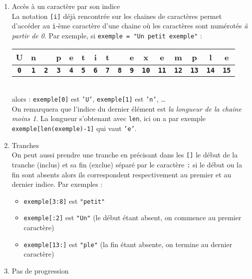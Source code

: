 \documentclass[11pt,a4paper]{article}
\begin{document}
\begin{tcolorbox}[left=0cm,title=\bf{\faPython \; Tranches},colbacktitle=cfond]
	\begin{enumerate}
	 \item[\ding{182}] Accès à un caractère par son indice \\
	 La notation {\tt [i]} déjà rencontrée sur les chaines de caractères permet d'accéder au {\tt i}-ème caractère d'une chaine où les caractères sont numérotés \textit{à partir de 0}. Par exemple,
	 si \texttt{exemple = "Un petit exemple"} : \\
	 \newcommand{\ind}[1]{\multicolumn{1}{c}{\textbf{\tt \footnotesize #1}}}
	 \begin{tabular}{|c|c|c|c|c|c|c|c|c|c|c|c|c|c|c|c|}
		\hline
		U & n & & p & e & t & i & t&  & e & x & e & m & p & l & e \\
		\hline
		\ind{0} & \ind{1}& \ind{2}& \ind{3}& \ind{4}& \ind{5}& \ind{6}& \ind{7}& \ind{8}& \ind{9}& \ind{10}& \ind{11}& \ind{12}& \ind{13}& \ind{14} & \ind{15}
	 \end{tabular}\\
	 alors : \texttt{exemple[0]} est {\tt 'U'}, \texttt{exemple[1]} est {\tt 'n'}, \dots \\
	 {\small \important} \; On remarquera que l'indice du dernier élément est  \textit{la longueur de la chaine moins 1}. La longueur s'obtenant avec {\tt len}, ici on a par exemple \texttt{exemple[len(exemple)-1]} qui vaut {\tt 'e'}.
	 \item[\ding{183}] Tranches \\
	 On peut aussi prendre une tranche en précisant dans les {\tt []} le début de la tranche (inclus) et sa fin (exclue) séparé par le caractère {\tt :} si le début ou la fin sont absents alors ils correspondent respectivement au premier et au dernier indice. Par exemples :
	 \begin{itemize}
	  \item[\textbullet] \texttt{exemple[3:8]} est {\tt "petit"}
	  \item[\textbullet] \texttt{exemple[:2]} est {\tt "Un"} (le début étant absent, on commence au premier caractère)
	  \item[\textbullet] \texttt{exemple[13:]} est {\tt "ple"} (la fin étant absente, on termine au dernier caractère)
	 \end{itemize}	
	\item[\ding{184}] Pas de progression \\

\end{enumerate}
\end{tcolorbox}
\end{document}
